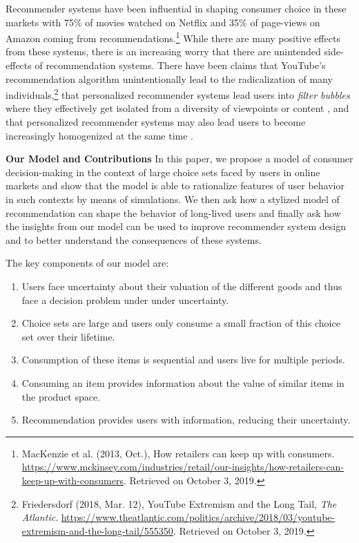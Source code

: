 \documentclass[sigconf]{acmart}
\begin{document}
Recommender systems have been influential in shaping consumer choice in these markets with 75\% of movies watched on Netflix and 35\% of page-views on Amazon coming from recommendations.\footnote{MacKenzie et al. (2013, Oct.),  How retailers can keep up with consumers. \url{https://www.mckinsey.com/industries/retail/our-insights/how-retailers-can-keep-up-with-consumers}. Retrieved on October 3, 2019.} While there are many positive effects from these systems, there is an increasing worry that there are unintended side-effects of recommendation systems. There have been claims that YouTube's recommendation algorithm unintentionally lead to the radicalization of many individuals,\footnote{Friedersdorf (2018, Mar. 12), YouTube Extremism and the Long Tail, \textit{The Atlantic}. \url{https://www.theatlantic.com/politics/archive/2018/03/youtube-extremism-and-the-long-tail/555350}. Retrieved on October 3, 2019.} that personalized recommender systems lead users into \textit{filter bubbles} where they effectively get isolated from a diversity of viewpoints or content \cite{pariser2011filter}, and that personalized recommender systems may also lead users to become increasingly homogenized at the same time \cite{chaney2018algorithmic, hosanagar2013will}.
\par

\textbf{Our Model and Contributions} In this paper, 
we propose a model of consumer decision-making in the context of large choice sets faced by users in online markets and show that the model is able to rationalize features of user behavior in such contexts by means of simulations. 
We then ask how a stylized model of recommendation can shape the behavior of long-lived users
and finally ask how the insights from our model can be used to improve recommender system design and to better understand the consequences of these systems.
\par

The key components of our model are:
\begin{enumerate}[label=(\arabic*)]
\item Users face uncertainty about their valuation of the different goods and thus face a decision problem under under uncertainty.
\item Choice sets are large and users only consume a small fraction of this choice set over their lifetime.
\item Consumption of these items is sequential and users live for multiple periods.
\item Consuming an item provides information about the value of similar items in the product space.
\item Recommendation provides users with information, reducing their uncertainty.
\end{enumerate}
\end{document}
